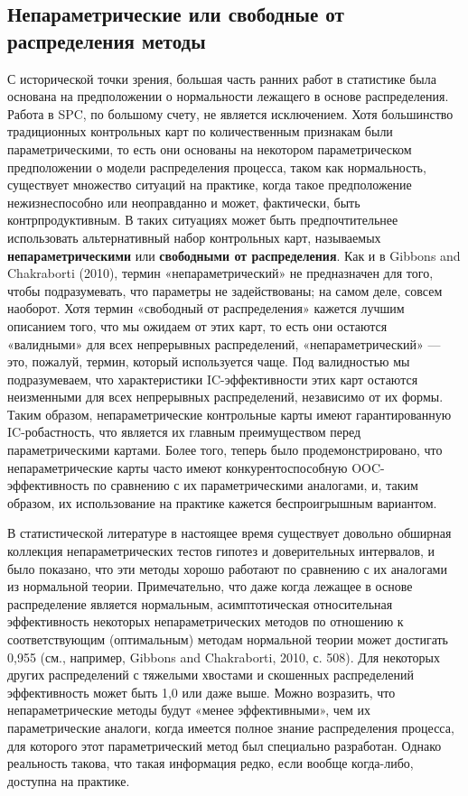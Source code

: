 \subsection{Непараметрические или свободные от распределения методы}
С исторической точки зрения, большая часть ранних работ в статистике была основана на предположении о нормальности лежащего в основе распределения. Работа в SPC, по большому счету, не является исключением. Хотя большинство традиционных контрольных карт по количественным признакам были параметрическими, то есть они основаны на некотором параметрическом предположении о модели распределения процесса, таком как нормальность, существует множество ситуаций на практике, когда такое предположение нежизнеспособно или неоправданно и может, фактически, быть контрпродуктивным. В таких ситуациях может быть предпочтительнее использовать альтернативный набор контрольных карт, называемых \textbf{непараметрическими} или \textbf{свободными от распределения}. Как и в Gibbons and Chakraborti (2010), термин «непараметрический» не предназначен для того, чтобы подразумевать, что параметры не задействованы; на самом деле, совсем наоборот. Хотя термин «свободный от распределения» кажется лучшим описанием того, что мы ожидаем от этих карт, то есть они остаются «валидными» для всех непрерывных распределений, «непараметрический» — это, пожалуй, термин, который используется чаще. Под валидностью мы подразумеваем, что характеристики IC-эффективности этих карт остаются неизменными для всех непрерывных распределений, независимо от их формы. Таким образом, непараметрические контрольные карты имеют гарантированную IC-робастность, что является их главным преимуществом перед параметрическими картами. Более того, теперь было продемонстрировано, что непараметрические карты часто имеют конкурентоспособную OOC-эффективность по сравнению с их параметрическими аналогами, и, таким образом, их использование на практике кажется беспроигрышным вариантом.

В статистической литературе в настоящее время существует довольно обширная коллекция непараметрических тестов гипотез и доверительных интервалов, и было показано, что эти методы хорошо работают по сравнению с их аналогами из нормальной теории. Примечательно, что даже когда лежащее в основе распределение является нормальным, асимптотическая относительная эффективность некоторых непараметрических методов по отношению к соответствующим (оптимальным) методам нормальной теории может достигать 0,955 (см., например, Gibbons and Chakraborti, 2010, с. 508). Для некоторых других распределений с тяжелыми хвостами и скошенных распределений эффективность может быть 1,0 или даже выше. Можно возразить, что непараметрические методы будут «менее эффективными», чем их параметрические аналоги, когда имеется полное знание распределения процесса, для которого этот параметрический метод был специально разработан. Однако реальность такова, что такая информация редко, если вообще когда-либо, доступна на практике.

